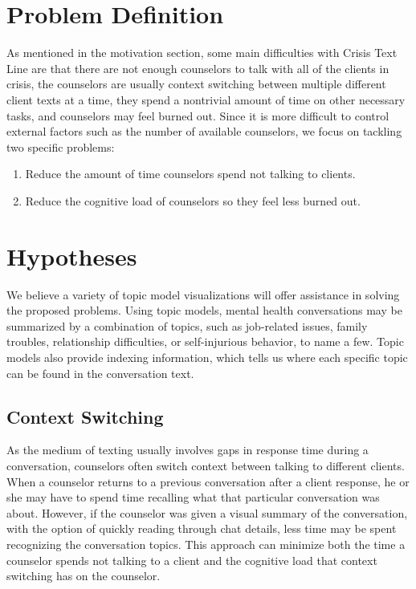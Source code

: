 \section{Problem Definition}

As mentioned in the motivation section, some main difficulties with Crisis Text Line
are that there are not enough counselors to talk with all of the clients in crisis, the
counselors are usually context switching between multiple different client texts at a
time, they spend a nontrivial amount of time on other necessary tasks, and counselors
may feel burned out. Since it is more difficult to control external factors such as the
number of available counselors, we focus on tackling two specific problems:
\begin{enumerate}
  \item Reduce the amount of time counselors spend not talking to clients.
  \item Reduce the cognitive load of counselors so they feel less burned out.
\end{enumerate}

\section{Hypotheses}

We believe a variety of topic model visualizations will offer assistance in solving the
proposed problems. Using topic models, mental health conversations may be
summarized by a combination of topics, such as job-related issues, family troubles,
relationship difficulties, or self-injurious behavior, to name a few. Topic models also
provide indexing information, which tells us where each specific topic can be found
in the conversation text.

\subsection{Context Switching}

As the medium of texting usually involves gaps in response time during a conversation,
counselors often switch context between talking to different clients. When a counselor
returns to a previous conversation after a client response, he or she may have to spend
time recalling what that particular conversation was about. However, if the counselor
was given a visual summary of the conversation, with the option of quickly reading
through chat details, less time may be spent recognizing the conversation topics. This
approach can minimize both the time a counselor spends not talking to a client and
the cognitive load that context switching has on the counselor.

